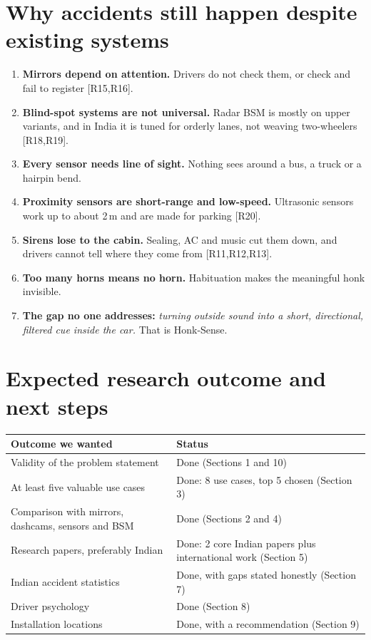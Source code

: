 \documentclass[11pt]{article}
\renewcommand{\cite}[1]{{\color{navy}[#1]}}
\begin{document}
\section{Why accidents still happen despite existing systems}
\begin{enumerate}[leftmargin=*]
  \item \textbf{Mirrors depend on attention.} Drivers do not check them, or check and fail to register \cite{R15,R16}.
  \item \textbf{Blind-spot systems are not universal.} Radar BSM is mostly on upper variants, and in India it is tuned for orderly lanes, not weaving two-wheelers \cite{R18,R19}.
  \item \textbf{Every sensor needs line of sight.} Nothing sees around a bus, a truck or a hairpin bend.
  \item \textbf{Proximity sensors are short-range and low-speed.} Ultrasonic sensors work up to about 2\,m and are made for parking \cite{R20}.
  \item \textbf{Sirens lose to the cabin.} Sealing, AC and music cut them down, and drivers cannot tell where they come from \cite{R11,R12,R13}.
  \item \textbf{Too many horns means no horn.} Habituation makes the meaningful honk invisible.
  \item \textbf{The gap no one addresses:} \emph{turning outside sound into a short, directional, filtered cue inside the car.} That is Honk-Sense.
\end{enumerate}

\section{Expected research outcome and next steps}
\begin{tabularx}{\textwidth}{@{}Xl@{}}
\toprule
\textbf{Outcome we wanted} & \textbf{Status} \\
\midrule
Validity of the problem statement & Done (Sections 1 and 10) \\
At least five valuable use cases & Done: 8 use cases, top 5 chosen (Section 3) \\
Comparison with mirrors, dashcams, sensors and BSM & Done (Sections 2 and 4) \\
Research papers, preferably Indian & Done: 2 core Indian papers plus international work (Section 5) \\
Indian accident statistics & Done, with gaps stated honestly (Section 7) \\
Driver psychology & Done (Section 8) \\
Installation locations & Done, with a recommendation (Section 9) \\
\bottomrule
\end{tabularx}
\end{document}
